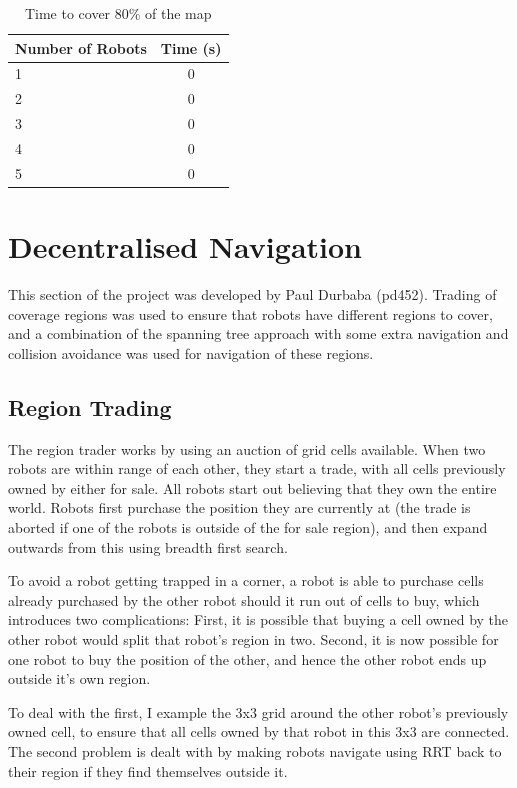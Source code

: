 \documentclass[a4paper, 10pt, conference]{ieeeconf}      %
\begin{document}
\begin{table}[h!]
  \begin{center}
    \caption{Time to cover 80\% of the map}
    \label{tab:table1}
    \begin{tabular}{|l|c|}
      \hline
      \textbf{Number of Robots} & \textbf{Time (s)} \\
      \hline
      1 & 0\\
      2 & 0\\
      3 & 0\\
      4 & 0\\
      5 & 0\\
      \hline
    \end{tabular}
  \end{center}
\end{table}


\section{Decentralised Navigation}
This section of the project was developed by Paul Durbaba (pd452). Trading of coverage regions was used to ensure that robots have different regions to cover, and a combination of the spanning tree approach with some extra navigation and collision avoidance was used for navigation of these regions.

\subsection{Region Trading}
The region trader works by using an auction of grid cells available. When two robots are within range of each other, they start a trade, with all cells previously owned by either for sale. All robots start out believing that they own the entire world. Robots first purchase the position they are currently at (the trade is aborted if one of the robots is outside of the for sale region), and then expand outwards from this using breadth first search.

To avoid a robot getting trapped in a corner, a robot is able to purchase cells already purchased by the other robot should it run out of cells to buy, which introduces two complications: First, it is possible that buying a cell owned by the other robot would split that robot's region in two. Second, it is now possible for one robot to buy the position of the other, and hence the other robot ends up outside it's own region.

To deal with the first, I example the 3x3 grid around the other robot's previously owned cell, to ensure that all cells owned by that robot in this 3x3 are connected. The second problem is dealt with by making robots navigate using RRT back to their region if they find themselves outside it.
\end{document}
